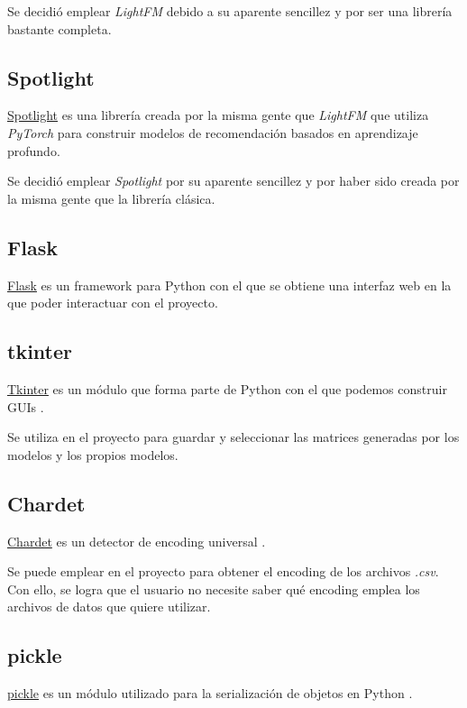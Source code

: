 Se decidió emplear \textit{LightFM} debido a su aparente sencillez y por ser una librería bastante completa.

\subsection{Spotlight}\label{spotlight}
\href{https://github.com/maciejkula/spotlight}{Spotlight} es una librería creada por la misma gente que \textit{LightFM} que utiliza \textit{PyTorch} para construir modelos de recomendación \cite{kula2017spotlight} basados en aprendizaje profundo.

Se decidió emplear \textit{Spotlight} por su aparente sencillez y por haber sido creada por la misma gente que la librería clásica.

\subsection{Flask}\label{flask}
\href{http://flask.pocoo.org/}{Flask} es un framework para Python con el que se obtiene una interfaz web en la que poder interactuar con el proyecto.

\subsection{tkinter}\label{tkinter}
\href{https://docs.python.org/3/library/tk.html}{Tkinter} es un módulo que forma parte de Python con el que podemos construir GUIs \cite{tkinter}.

Se utiliza en el proyecto para guardar y seleccionar las matrices generadas por los modelos y los propios modelos.

\subsection{Chardet}\label{chardet}
\href{https://pypi.org/project/chardet/}{Chardet} es un detector de encoding universal \cite{chardet}.

Se puede emplear en el proyecto para obtener el encoding de los archivos \textit{.csv}. Con ello, se logra que el usuario no necesite saber qué encoding emplea los archivos de datos que quiere utilizar.

\subsection{pickle}\label{pickle}
\href{https://docs.python.org/3/library/pickle.html}{pickle} es un módulo utilizado para la serialización de objetos en Python \cite{pickle}.

